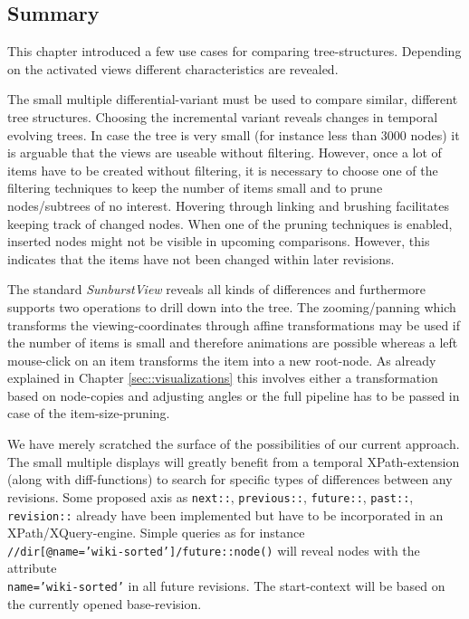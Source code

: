 
\subsection{Summary}
This chapter introduced a few use cases for comparing tree-structures. Depending on the activated views different characteristics are revealed. 

The small multiple differential-variant must be used to compare similar, different tree structures. Choosing the incremental variant reveals changes in temporal evolving trees. In case the tree is very small (for instance less than 3000 nodes) it is arguable that the views are useable without filtering. However, once a lot of items have to be created without filtering, it is necessary to choose one of the filtering techniques to keep the number of items small and to prune nodes/subtrees of no interest. Hovering through linking and brushing facilitates keeping track of changed nodes. When one of the pruning techniques is enabled, inserted nodes might not be visible in upcoming comparisons. However, this indicates that the items have not been changed within later revisions. 

The standard \emph{SunburstView} reveals all kinds of differences and furthermore supports two operations to drill down into the tree. The zooming/panning which transforms the viewing-coordinates through affine transformations may be used if the number of items is small and therefore animations are possible whereas a left mouse-click on an item transforms the item into a new root-node. As already explained in Chapter \ref{sec::visualizations} this involves either a transformation based on node-copies and adjusting angles or the full pipeline has to be passed in case of the item-size-pruning.

We have merely scratched the surface of the possibilities of our current approach. The small multiple displays will greatly benefit from a temporal XPath-extension (along with diff-functions) to search for specific types of differences between any revisions. Some proposed axis as \texttt{next::}, \texttt{previous::}, \texttt{future::}, \texttt{past::}, \texttt{revision::} already have been implemented but have to be incorporated in an XPath/XQuery-engine. Simple queries as for instance \\\texttt{//dir[@name='wiki-sorted']/future::node()} will reveal nodes with the attribute \\\texttt{name='wiki-sorted'} in all future revisions. The start-context will be based on the currently opened base-revision.
